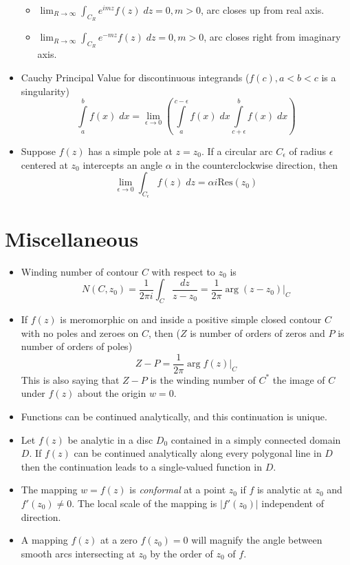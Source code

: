 \documentclass[10pt]{report}
\newcommand{\abs}[1]{\left|#1\right|}
\newcommand{\Res}[0]{\mathrm{Res} }
\begin{document}
\begin{itemize}
\begin{itemize}
            \item $\lim_{R \to \infty}\int_{C_R}e^{imz}f(z) \; dz = 0, m > 0$, arc closes up from real axis.
            \item $\lim_{R \to \infty} \int_{C_R}e^{-mz}f(z) \; dz = 0, m > 0$, arc closes right from imaginary axis.
        \end{itemize}
    \item Cauchy Principal Value for discontinuous integrands ($f(c), a < b < c$ is a singularity)
        $$\displaystyle\int\limits_{a}^{b}f(x)\;dx = \lim_{\epsilon \to 0}\left(\displaystyle\int\limits_{a}^{c-\epsilon}f(x)\; dx \displaystyle\int\limits_{c+\epsilon}^bf(x)\; dx\right)$$
    \item Suppose $f(z)$ has a simple pole at $z = z_0$. If a circular arc $C_\epsilon$ of radius $\epsilon$ centered at $z_0$ intercepts an angle $\alpha$ in the counterclockwise direction, then
        $$\lim_{\epsilon \to 0}\int_{C_\epsilon} f(z) \; dz = \alpha i\Res(z_0)$$
\end{itemize}

\section*{Miscellaneous}
\begin{itemize}
    \item Winding number of contour $C$ with respect to $z_0$ is 
        $$N(C,z_0) = \frac{1}{2\pi i}\int_C \frac{dz}{z-z_0} = \frac{1}{2\pi}\arg (z-z_0)\Big|_C$$
    \item If $f(z)$ is meromorphic on and inside a positive simple closed contour $C$ with no poles and zeroes on $C$, then ($Z$ is number of orders of zeros and $P$ is number of orders of poles)
        $$Z-P = \frac{1}{2\pi}\arg f(z) \Big|_C$$
        This is also saying that $Z-P$ is the winding number of $C^*$ the image of $C$ under $f(z)$ about the origin $w=0$. 
    \item Functions can be continued analytically, and this continuation is unique.
    \item Let $f(z)$ be analytic in a disc $D_0$ contained in a simply connected domain $D$. If $f(z)$ can be continued analytically along every polygonal line in $D$ then the continuation leads to a single-valued function in $D$.
    \item The mapping $w=f(z)$ is \emph{conformal} at a point $z_0$ if $f$ is analytic at $z_0$ and $f'(z_0) \neq 0$. The local scale of the mapping is $\abs{f'(z_0)}$ independent of direction. 
    \item A mapping $f(z)$ at a zero $f(z_0) = 0$ will magnify the angle between smooth arcs intersecting at $z_0$ by the order of $z_0$ of $f$.
\end{itemize}
\end{document}
